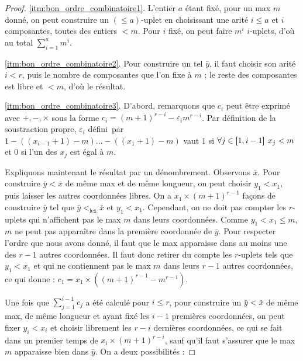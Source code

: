 \documentclass{report}
\newcommand{\leqa}{\left( \leqslant a \right)}
\begin{document}
		\begin{proof}
			\ref{itm:bon_ordre_combinatoire1}. L'entier $a$ étant fixé, pour un max $m$ donné, on peut construire un $\leqa$-uplet en choisissant une arité $i \leqslant a$ et $i$ composantes, toutes des entiers $< m$. Pour $i$ fixé, on peut faire $m^{i}$ $i$-uplets, d'où au total $\sum_{i=1}^{a} m^i$.
			
			\ref{itm:bon_ordre_combinatoire2}. Pour construire un tel $\bar{y}$, il faut choisir son arité $i<r$, puis le nombre de composantes que l'on fixe à $m$ ; le reste des composantes est libre et $<m$, d'où le résultat.
			
			\ref{itm:bon_ordre_combinatoire3}. D'abord, remarquons que $c_i$ peut être exprimé avec $+,-,\times$ sous la forme $c_i = \left( m+1 \right)^{r-i} - \varepsilon_i m^{r-i}$. Par définition de la soustraction propre, $\varepsilon_i$ défini\footnotemark\ par $1 - \left(\left(x_{i-1} +1 \right)-m\right) \dots  - \left(\left(x_1 +1 \right)-m\right)$ vaut $1$ si $ \forall j \in \left[\!\!\>\!\left[ 1 , i-1 \right]\!\!\>\!\right] \: x_j < m$ et $0$ si l'un des $x_j$ est égal à $m$.
			
			
			Expliquons maintenant le résultat par un dénombrement. Observons $\bar{x}$. Pour construire $\bar{y} < \bar{x}$ de même max et de même longueur, on peut choisir $y_1<x_1$, puis laisser les autres coordonnées libres. On a $x_1 \times \left(m+1\right)^{r-1}$ façons de construire $\bar{y}$ tel que $\bar{y} <_{\text{lex}} \bar{x}$ et $y_1<x_1$. Cependant, on ne doit pas compter les $r$-uplets qui n'affichent pas le max $m$ dans leurs coordonnées. Comme $y_1 < x_1 \leqslant m$, $m$ ne peut pas apparaître dans la première coordonnée de $\bar{y}$. Pour respecter l'ordre que nous avons donné, il faut que le max apparaisse dans au moins une des $r-1$ autres coordonnées. Il faut donc retirer du compte les $r$-uplets tels que $y_1<x_1$ et qui ne contiennent pas le max $m$ dans leurs $r-1$ autres coordonnées, ce qui donne : $c_1 = x_1 \times \left(\left(m+1\right)^{r-1} - m^{r-1}\right)$.

			
			Une fois que $\sum_{j=1}^{i-1} c_j$ a été calculé pour $i \leqslant r$, pour construire un $\bar{y} < \bar{x}$ de même max, de même longueur et ayant fixé les $i-1$ premières coordonnées, on peut fixer $y_i<x_i$ et choisir librement les $r-i$ dernières coordonnées, ce qui se fait dans un premier temps de $x_i \times \left(m+1\right)^{r-i}$, sauf qu'il faut s'assurer que le max $m$ apparaisse bien dans $\bar{y}$. On a deux possibilités :
			

\end{proof}
\end{document}
